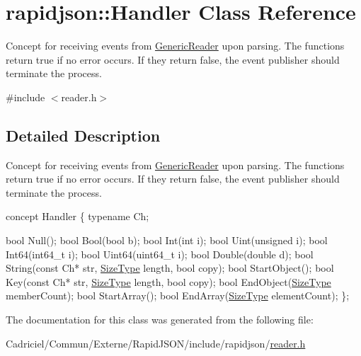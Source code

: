 \hypertarget{classrapidjson_1_1_handler}{}\section{rapidjson\+:\+:Handler Class Reference}
\label{classrapidjson_1_1_handler}


Concept for receiving events from \hyperlink{class_generic_reader}{Generic\+Reader} upon parsing. The functions return true if no error occurs. If they return false, the event publisher should terminate the process.  




{\ttfamily \#include $<$reader.\+h$>$}



\subsection{Detailed Description}
Concept for receiving events from \hyperlink{class_generic_reader}{Generic\+Reader} upon parsing. The functions return true if no error occurs. If they return false, the event publisher should terminate the process. 


\begin{DoxyCode}
concept Handler \{
    \textcolor{keyword}{typename} Ch;

    \textcolor{keywordtype}{bool} Null();
    \textcolor{keywordtype}{bool} Bool(\textcolor{keywordtype}{bool} b);
    \textcolor{keywordtype}{bool} Int(\textcolor{keywordtype}{int} i);
    \textcolor{keywordtype}{bool} Uint(\textcolor{keywordtype}{unsigned} i);
    \textcolor{keywordtype}{bool} Int64(int64\_t i);
    \textcolor{keywordtype}{bool} Uint64(uint64\_t i);
    \textcolor{keywordtype}{bool} Double(\textcolor{keywordtype}{double} d);
    \textcolor{keywordtype}{bool} String(\textcolor{keyword}{const} Ch* str, \hyperlink{rapidjson_8h_a5ed6e6e67250fadbd041127e6386dcb5}{SizeType} length, \textcolor{keywordtype}{bool} copy);
    \textcolor{keywordtype}{bool} StartObject();
    \textcolor{keywordtype}{bool} Key(\textcolor{keyword}{const} Ch* str, \hyperlink{rapidjson_8h_a5ed6e6e67250fadbd041127e6386dcb5}{SizeType} length, \textcolor{keywordtype}{bool} copy);
    \textcolor{keywordtype}{bool} EndObject(\hyperlink{rapidjson_8h_a5ed6e6e67250fadbd041127e6386dcb5}{SizeType} memberCount);
    \textcolor{keywordtype}{bool} StartArray();
    \textcolor{keywordtype}{bool} EndArray(\hyperlink{rapidjson_8h_a5ed6e6e67250fadbd041127e6386dcb5}{SizeType} elementCount);
\};
\end{DoxyCode}
 

The documentation for this class was generated from the following file\+:\begin{DoxyCompactItemize}
\item 
Cadriciel/\+Commun/\+Externe/\+Rapid\+J\+S\+O\+N/include/rapidjson/\hyperlink{reader_8h}{reader.\+h}\end{DoxyCompactItemize}
